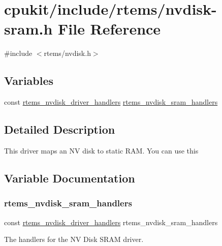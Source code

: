 \hypertarget{nvdisk-sram_8h}{}\section{cpukit/include/rtems/nvdisk-\/sram.h File Reference}
\label{nvdisk-sram_8h}
{\ttfamily \#include $<$rtems/nvdisk.\+h$>$}\newline
\subsection*{Variables}
\begin{DoxyCompactItemize}
\item 
const \mbox{\hyperlink{structrtems__nvdisk__driver__handlers}{rtems\+\_\+nvdisk\+\_\+driver\+\_\+handlers}} \mbox{\hyperlink{nvdisk-sram_8h_ad46debc476911ad0b3e2ffdf17ea2ab3}{rtems\+\_\+nvdisk\+\_\+sram\+\_\+handlers}}
\end{DoxyCompactItemize}


\subsection{Detailed Description}
This driver maps an NV disk to static R\+AM. You can use this 

\subsection{Variable Documentation}
\mbox{\label{nvdisk-sram_8h_ad46debc476911ad0b3e2ffdf17ea2ab3}} 
\subsubsection{\texorpdfstring{rtems\_nvdisk\_sram\_handlers}{rtems\_nvdisk\_sram\_handlers}}
{\footnotesize\ttfamily const \mbox{\hyperlink{structrtems__nvdisk__driver__handlers}{rtems\+\_\+nvdisk\+\_\+driver\+\_\+handlers}} rtems\+\_\+nvdisk\+\_\+sram\+\_\+handlers}

The handlers for the NV Disk S\+R\+AM driver. 